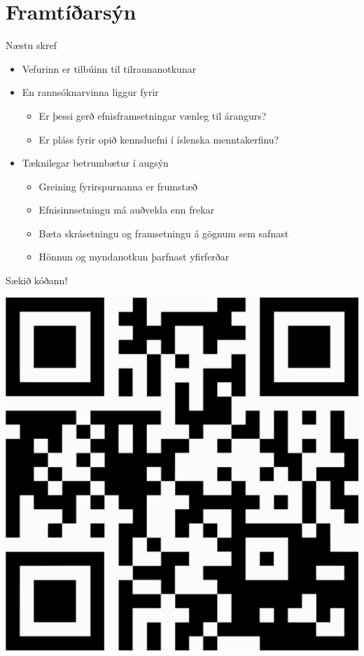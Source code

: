 \documentclass{beamer}
\begin{document}
\section{Framtíðarsýn}

\begin{frame}{Næstu skref}
    \begin{itemize}
        \item Vefurinn er tilbúinn til tilraunanotkunar
        \item En rannsóknarvinna liggur fyrir
        \begin{itemize}
            \item Er þessi gerð efnisframsetningar vænleg til árangurs?
            \item Er pláss fyrir opið kennsluefni í íslenska menntakerfinu?
        \end{itemize}
        \item Tæknilegar betrumbætur í augsýn
        \begin{itemize}
            \item Greining fyrirspurnanna er frumstæð
            \item Efnisinnsetningu má auðvelda enn frekar
            \item Bæta skrásetningu og framsetningu á gögnum sem safnast
            \item Hönnun og myndanotkun þarfnast yfirferðar
        \end{itemize}
    \end{itemize}
\end{frame}

\begin{frame}{Sækið kóðann!}
    \begin{center}
        \includegraphics[height=0.7\textheight]{qr-code}
    \end{center}
\end{frame}
\end{document}
